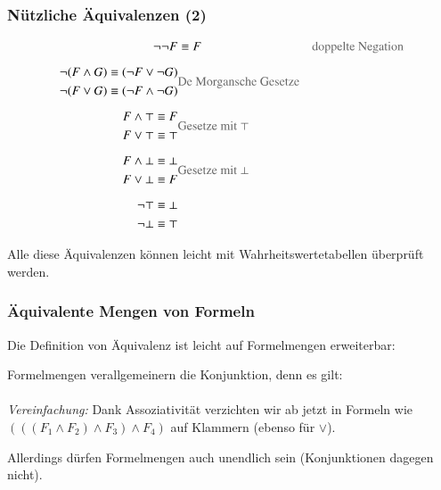 \documentclass[aspectratio=1610,onlymath]{beamer}
\begin{document}
\begin{frame}\frametitle{Nützliche Äquivalenzen (2)}

\begin{align*}
\neg\neg F &\equiv F
		& \text{\textcolor{devilscss}{doppelte Negation}}\\[1ex]
%
\begin{split}
\neg(F\wedge G) & \equiv (\neg F\vee \neg G)\\
\neg(F\vee G) & \equiv (\neg F\wedge \neg G)
\end{split}
		& \text{\textcolor{devilscss}{De Morgansche Gesetze}} \\[1ex]
%
\begin{split}
F\wedge \top & \equiv F\\
F\vee \top & \equiv \top
\end{split}
		& \text{\textcolor{devilscss}{Gesetze mit $\top$}}\\[1ex]
%
\begin{split}
F\wedge \bot & \equiv \bot\\
F\vee \bot & \equiv F
\end{split}
		& \text{\textcolor{devilscss}{Gesetze mit $\bot$}}\\[1ex]
%
\begin{split}
\neg\top & \equiv \bot\\
\neg\bot & \equiv \top
\end{split}
		& 
\end{align*}

Alle diese Äquivalenzen können leicht mit Wahrheitswertetabellen überprüft werden.

\end{frame}

\begin{frame}\frametitle{Äquivalente Mengen von Formeln}

Die Definition von Äquivalenz ist leicht auf Formelmengen erweiterbar:\medskip

\medskip\pause

Formelmengen verallgemeinern die Konjunktion, denn es gilt:\\[0.5ex]
%
\\[1ex]
%
\emph{Vereinfachung:} Dank Assoziativität verzichten wir ab jetzt in Formeln wie $(((F_1\wedge F_2)\wedge F_3)\wedge F_4)$
auf Klammern (ebenso für $\vee$).
\bigskip

Allerdings dürfen Formelmengen auch unendlich sein (Konjunktionen dagegen nicht).

\end{frame}
\end{document}
